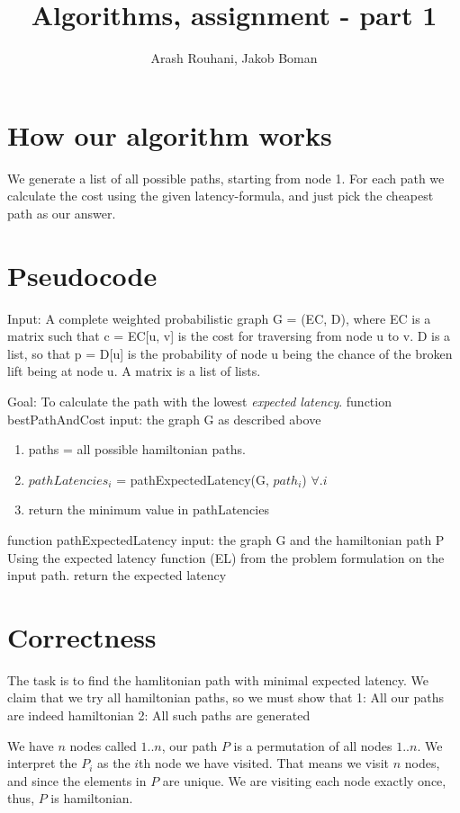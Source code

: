 \documentclass[a4paper,11pt]{article}
\title{Algorithms, assignment - part 1}
\author{Arash Rouhani, Jakob Boman}
\begin{document}
\maketitle

\section{How our algorithm works}
We generate a list of all possible paths, starting from node 1. For each path we calculate the cost using the given latency-formula, and just pick the cheapest path as our answer.

\section{Pseudocode}
Input: A complete weighted probabilistic graph G = (EC, D), where EC is a
matrix such that c = EC[u, v] is the cost for traversing from node u to v.
D is a list, so that p = D[u] is the probability of node u being
the chance of the broken lift being at node u.
A matrix is a list of lists.

Goal: To calculate the path with the lowest \emph{expected latency}.
function bestPathAndCost
input: the graph G as described above
\begin{enumerate}
    \item paths = all possible hamiltonian paths.
    \item $pathLatencies_i$ = pathExpectedLatency(G, $path_i$) $\forall. i$
    \item return the minimum value in pathLatencies
\end{enumerate}
function pathExpectedLatency
input: the graph G and the hamiltonian path P
    Using the expected latency function (EL) from the problem formulation on the input path.
    return the expected latency

\section{Correctness}
The task is to find the hamlitonian path with minimal expected latency.
We claim that we try all hamiltonian paths, so we must show that
1: All our paths are indeed hamiltonian
2: All such paths are generated

We have $n$ nodes called $1..n$, our path $P$ is a permutation of all nodes $1..n$.
We interpret the $P_i$ as the $i$th node we have visited.
That means we visit $n$ nodes, and since the elements in $P$ are unique.
We are visiting each node exactly once, thus, $P$ is hamiltonian.
\end{document}
